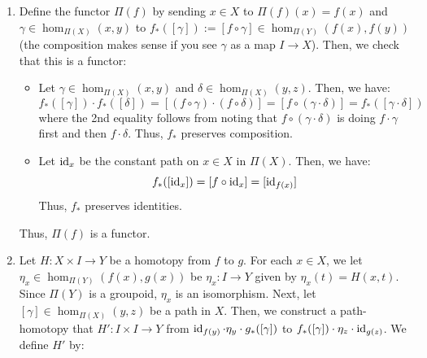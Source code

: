\documentclass[12pt]{article}
\begin{document}
\begin{solution}
\begin{enumerate}
    Thus, $F' \circ F \cong \id_{\pi_1(X, x)}$. \bbni
    Finally, we check $F \circ F' \cong \id_{\Pi(X)}$. For any object $y \in \Pi(X)$, note that:
    \[ F\circ F'(y) = F(x) = x \]
    Thus, we let $\eta_y = [\alpha_y] \in \hom_{\Pi(X)}(FF'(y), y)$. This is clearly an isomorphism (everything in a groupoid is). Moreover, for any morphism $[\gamma] \in \hom_{\Pi(X)}(y, z)$, we have:
    \begin{align*}
        \eta_z \circ FF'([\gamma]) &= FF'([\gamma]) \cdot \eta_z \\
        &= F([\alpha_y \cdot \gamma \cdot \alpha_z^{-1}]) \cdot [\alpha_z] \\
        &= [\alpha_y \cdot \gamma \cdot \alpha_z^{-1}] \cdot [\alpha_z] \\
        &= [\alpha_y \cdot \gamma] \\
        &= [\gamma] \circ [\alpha_y] \\
        &= \id_{\Pi(X)}([\gamma]) \circ \eta_y
    \end{align*}
    Thus, $F \circ F' \cong \id_{\Pi(X)}$. Thus, we have show than $F$ is an equivalence of categories.
    \item Define the functor $\Pi(f)$ by sending $x \in X$ to $\Pi(f)(x) = f(x)$ and $\gamma \in \hom_{\Pi(X)}(x,y)$ to $f_*([\gamma]) := [f \circ \gamma] \in \hom_{\Pi(Y)}(f(x), f(y))$ (the composition makes sense if you see $\gamma$ as a map $I \to X$). Then, we check that this is a functor:
    \begin{itemize}
        \item Let $\gamma \in \hom_{\Pi(X)}(x,y)$ and $\delta \in \hom_{\Pi(X)}(y,z)$. Then, we have:
        \[ f_*([\gamma]) \cdot f_*([\delta]) = [(f \circ \gamma) \cdot (f \circ \delta)] = [f \circ (\gamma \cdot \delta)] = f_*([\gamma \cdot \delta])\]
        where the 2nd equality follows from noting that $f \circ (\gamma \cdot \delta)$ is doing $f \cdot \gamma$ first and then $f \cdot \delta$. Thus, $f_*$ preserves composition.
        \item Let $\operatorname{id}_x$ be the constant path on $x \in X$ in $\Pi(X)$. Then, we have:
        \[ f_*([\operatorname{id}_x]) = [f \circ \operatorname{id}_x] = [\operatorname{id}_{f(x)}]\]
        Thus, $f_*$ preserves identities.
    \end{itemize}
    Thus, $\Pi(f)$ is a functor.
    \item Let $H: X \times I \to Y$ be a homotopy from $f$ to $g$. For each $x \in X$, we let $\eta_x \in \hom_{\Pi(Y)}(f(x), g(x))$ be $\eta_x: I \to Y$ given by $\eta_x(t) = H(x, t)$. Since $\Pi(Y)$ is a groupoid, $\eta_x$ is an isomorphism. Next, let $[\gamma] \in \hom_{\Pi(X)}(y,z)$ be a path in $X$. Then, we construct a path-homotopy that $H': I \times I \to Y$ from $\operatorname{id}_{f(y)} \cdot \eta_y \cdot g_*([\gamma])$ to $f_*([\gamma]) \cdot \eta_z \cdot \operatorname{id}_{g(z)}$. We define $H'$ by:

\end{enumerate}
\end{solution}
\end{document}
